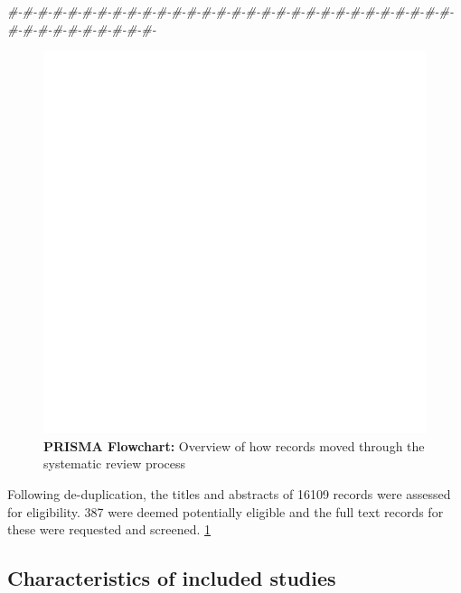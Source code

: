 \documentclass[a4paper, twoside]{templates/ociamthesis}
\newenvironment{Shaded}{\begin{snugshade}}{\end{snugshade}}
\newcommand{\CommentTok}[1]{\textcolor[rgb]{0.56,0.35,0.01}{\textit{#1}}}
\renewenvironment{Shaded}
{
  \vspace{4pt}%
  \begin{snugshade}%
}{%
  \end{snugshade}%
  \vspace{4pt}%
}
\begin{document}
\begin{Shaded}
\begin{Highlighting}[]
\CommentTok{\#{-}\#{-}\#{-}\#{-}\#{-}\#{-}\#{-}\#{-}\#{-}\#{-}\#{-}\#{-}\#{-}\#{-}\#{-}\#{-}\#{-}\#{-}\#{-}\#{-}\#{-}\#{-}\#{-}\#{-}\#{-}\#{-}\#{-}\#{-}\#{-}\#{-}\#{-}\#{-}\#{-}\#{-}\#{-}\#{-}\#{-}\#{-}\#{-}\#{-}}
\end{Highlighting}
\end{Shaded}





\begin{figure}
\includegraphics[width=1\linewidth]{figures/sys-rev/prismaflow} \caption[PRISMA Flowchart]{\textbf{PRISMA Flowchart:} Overview of how records moved through the systematic review process}\label{fig:prisma-flow-fig}
\end{figure}

Following de-duplication, the titles and abstracts of 16109 records were assessed for eligibility. 387 were deemed potentially eligible and the full text records for these were requested and screened. \ref{fig:prisma-flow-fig}

\hypertarget{characteristics-of-included-studies}{%
\subsection{Characteristics of included studies}\label{characteristics-of-included-studies}}
\end{document}
